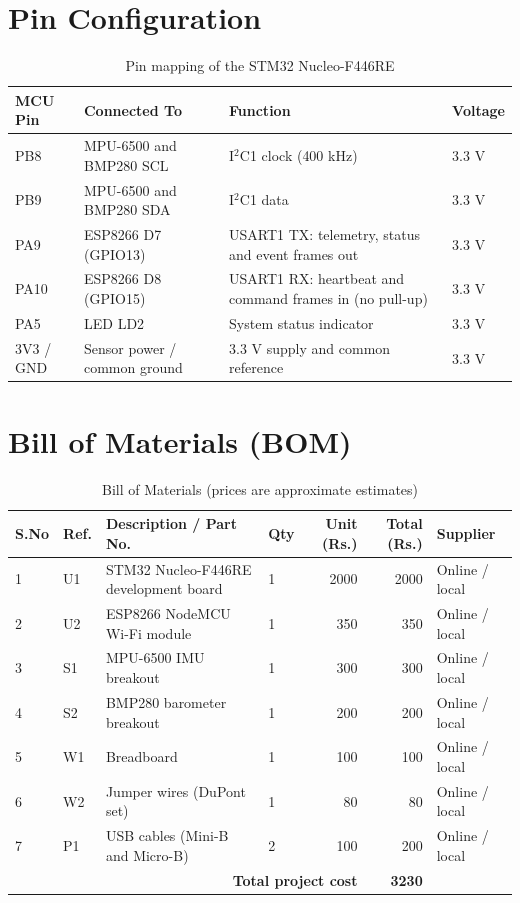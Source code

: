 \documentclass[12pt,a4paper]{report}
\newcommand{\rupee}{Rs.}  %
\begin{document}
\section{Pin Configuration}
\begin{table}[htbp]
\centering
\caption{Pin mapping of the STM32 Nucleo-F446RE}
\label{tab:pins}
\small
\begin{tabularx}{\textwidth}{llXl}
\toprule
\textbf{MCU Pin} & \textbf{Connected To} & \textbf{Function} & \textbf{Voltage}\\
\midrule
PB8 & MPU-6500 and BMP280 SCL & I$^2$C1 clock (400 kHz) & 3.3 V\\
PB9 & MPU-6500 and BMP280 SDA & I$^2$C1 data & 3.3 V\\
PA9 & ESP8266 D7 (GPIO13) & USART1 TX: telemetry, status and event frames out & 3.3 V\\
PA10 & ESP8266 D8 (GPIO15) & USART1 RX: heartbeat and command frames in (no pull-up) & 3.3 V\\
PA5 & LED LD2 & System status indicator & 3.3 V\\
3V3 / GND & Sensor power / common ground & 3.3 V supply and common reference & 3.3 V\\
\bottomrule
\end{tabularx}
\end{table}

\section{Bill of Materials (BOM)}
\begin{table}[htbp]
\centering
\caption{Bill of Materials (prices are approximate estimates)}
\label{tab:bom}
\small
\begin{tabularx}{\textwidth}{llXlrrl}
\toprule
\textbf{S.No} & \textbf{Ref.} & \textbf{Description / Part No.} & \textbf{Qty} & \textbf{Unit (\rupee)} & \textbf{Total (\rupee)} & \textbf{Supplier}\\
\midrule
1 & U1 & STM32 Nucleo-F446RE development board & 1 & 2000 & 2000 & Online / local\\
2 & U2 & ESP8266 NodeMCU Wi-Fi module & 1 & 350 & 350 & Online / local\\
3 & S1 & MPU-6500 IMU breakout & 1 & 300 & 300 & Online / local\\
4 & S2 & BMP280 barometer breakout & 1 & 200 & 200 & Online / local\\
5 & W1 & Breadboard & 1 & 100 & 100 & Online / local\\
6 & W2 & Jumper wires (DuPont set) & 1 & 80 & 80 & Online / local\\
7 & P1 & USB cables (Mini-B and Micro-B) & 2 & 100 & 200 & Online / local\\
\midrule
\multicolumn{5}{r}{\textbf{Total project cost}} & \textbf{3230} & \\
\bottomrule
\end{tabularx}
\end{table}
\end{document}
